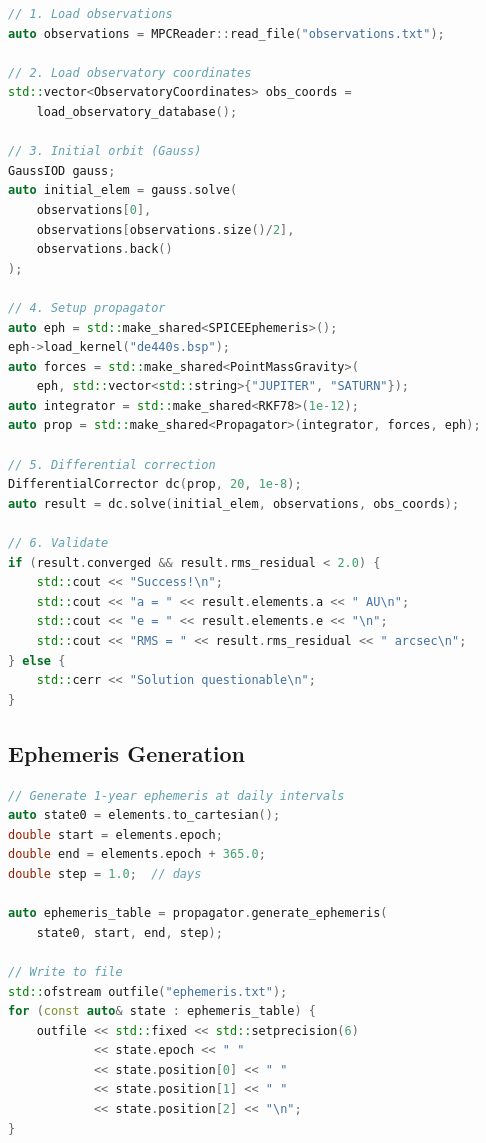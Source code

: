 \begin{lstlisting}[language=C++]
// 1. Load observations
auto observations = MPCReader::read_file("observations.txt");

// 2. Load observatory coordinates
std::vector<ObservatoryCoordinates> obs_coords = 
    load_observatory_database();

// 3. Initial orbit (Gauss)
GaussIOD gauss;
auto initial_elem = gauss.solve(
    observations[0], 
    observations[observations.size()/2], 
    observations.back()
);

// 4. Setup propagator
auto eph = std::make_shared<SPICEEphemeris>();
eph->load_kernel("de440s.bsp");
auto forces = std::make_shared<PointMassGravity>(
    eph, std::vector<std::string>{"JUPITER", "SATURN"});
auto integrator = std::make_shared<RKF78>(1e-12);
auto prop = std::make_shared<Propagator>(integrator, forces, eph);

// 5. Differential correction
DifferentialCorrector dc(prop, 20, 1e-8);
auto result = dc.solve(initial_elem, observations, obs_coords);

// 6. Validate
if (result.converged && result.rms_residual < 2.0) {
    std::cout << "Success!\n";
    std::cout << "a = " << result.elements.a << " AU\n";
    std::cout << "e = " << result.elements.e << "\n";
    std::cout << "RMS = " << result.rms_residual << " arcsec\n";
} else {
    std::cerr << "Solution questionable\n";
}
\end{lstlisting}

\subsection{Ephemeris Generation}

\begin{lstlisting}[language=C++]
// Generate 1-year ephemeris at daily intervals
auto state0 = elements.to_cartesian();
double start = elements.epoch;
double end = elements.epoch + 365.0;
double step = 1.0;  // days

auto ephemeris_table = propagator.generate_ephemeris(
    state0, start, end, step);

// Write to file
std::ofstream outfile("ephemeris.txt");
for (const auto& state : ephemeris_table) {
    outfile << std::fixed << std::setprecision(6)
            << state.epoch << " "
            << state.position[0] << " "
            << state.position[1] << " "
            << state.position[2] << "\n";
}
\end{lstlisting}

